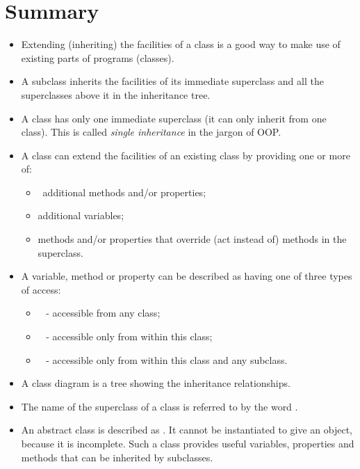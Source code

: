 	\section{Summary}
		\begin{itemize}
      \item Extending (inheriting) the facilities of a class is a good way to make use of existing parts of programs (classes).
      \item A subclass inherits the facilities of its immediate superclass and all the superclasses above it in the inheritance tree.
			\item A class has only one immediate superclass (it can only inherit from one class). This is called \emph{single inheritance} in the jargon of OOP.
      \item A class can extend the facilities of an existing class by providing one or more of:
				\begin{itemize}
					\item additional methods and/or properties;
					\item	additional variables;
					\item	methods and/or properties that override (act instead of) methods in the superclass.
				\end{itemize}
      \item A variable, method or property can be described as having one of three types of access:
				\begin{itemize}
					\item  - accessible from any class;
					\item  - accessible only from within this class;
					\item  - accessible only from within this class and any subclass.
				\end{itemize}
      \item A class diagram is a tree showing the inheritance relationships.
      \item The name of the superclass of a class is referred to by the word .
      \item An abstract class is described as . It cannot be instantiated to give an object, because it is incomplete. Such a class provides useful variables, properties and methods that can be inherited by subclasses.
		\end{itemize}


